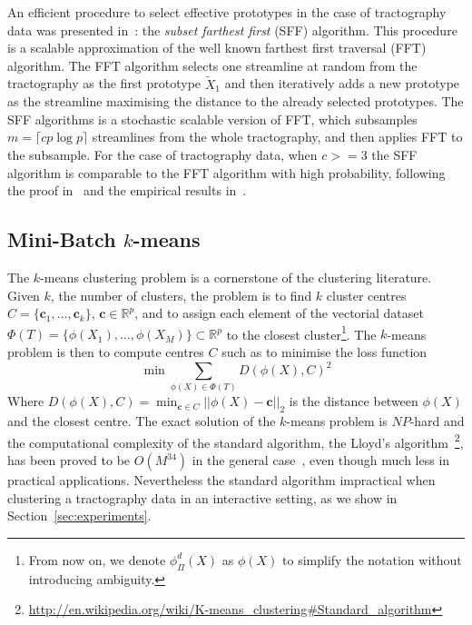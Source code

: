 An efficient procedure to select effective prototypes in the case of
tractography data was presented in~\cite{olivetti2012approximation}:
the \emph{subset farthest first} (SFF) algorithm. This procedure is a
scalable approximation of the well known farthest first traversal
(FFT) algorithm.
The FFT algorithm selects one streamline at random from the
tractography as the first prototype $\tilde{X}_1$ and then iteratively
adds a new prototype as the streamline maximising the distance to the
already selected prototypes. The SFF algorithms is a stochastic
scalable version of FFT, which subsamples $m = \lceil c p \log p
\rceil$ streamlines from the whole tractography, and then applies FFT
to the subsample. For the case of tractography data, when $c>=3$ the
SFF algorithm is comparable to the FFT algorithm with high
probability, following the proof in~\cite{turnbull2005fast} and the
empirical results in~\cite{olivetti2012approximation}.


\subsection{Mini-Batch $k$-means}
\label{sec:mbkm}
The $k$-means clustering problem is a cornerstone of the clustering
literature. Given $k$, the number of clusters, the problem is to find
$k$ cluster centres $C = \{\mathbf{c}_1,\ldots,\mathbf{c}_k\}$,
$\mathbf{c} \in \mathbb{R}^p$, and to assign each element of the
vectorial dataset $\Phi(T) = \{\phi(X_1),\ldots,\phi(X_M)\} \subset
\mathbb{R}^p$ to the closest cluster\footnote{From now on, we denote
  $\phi_{\Pi}^d(X)$ as $\phi(X)$ to simplify the notation without
  introducing ambiguity.}. The $k$-means problem is then to compute
centres $C$ such as to minimise the loss function
\begin{equation}
  \label{eq:kmeans_loss}
  \min \sum_{\phi(X) \in \Phi(T)} D(\phi(X),C)^2
\end{equation}
Where $D(\phi(X),C) = \min_{\mathbf{c} \in C}||\phi(X) -
\mathbf{c}||_2$ is the distance between $\phi(X)$ and the closest
centre. The exact solution of the $k$-means problem is $NP$-hard and
the computational complexity of the standard algorithm, the Lloyd's
algorithm~\footnote{\url{http://en.wikipedia.org/wiki/K-means_clustering#Standard_algorithm}},
has been proved to be $O(M^{34})$ in the general
case~\cite{arthur2009kmeans}, even though much less in practical
applications. Nevertheless the standard algorithm impractical when
clustering a tractography data in an interactive setting, as we show
in Section~\ref{sec:experiments}.

